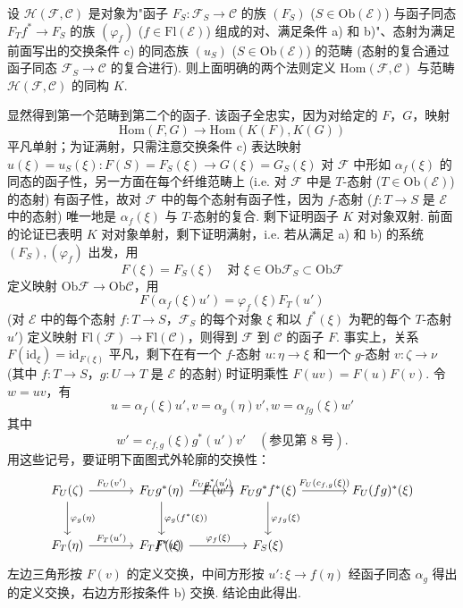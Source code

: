 \begin{proposition}\label{prop:VI.12.1}
设 $\mathcal{H}(\mathcal{F}, \mathcal{C})$ 是对象为"函子 $F_S \colon \mathcal{F}_S \to \mathcal{C}$ 的族 $(F_S)$ ($S \in \mathrm{Ob}(\mathcal{E})$) 与函子同态 $F_T f^{*} \to F_S$ 的族 $(\varphi_f)$ ($f \in \mathrm{Fl}(\mathcal{E})$) 组成的对、满足条件 a) 和 b)"、态射为满足前面写出的交换条件 c) 的同态族 $(u_S)$ ($S \in \mathrm{Ob}(\mathcal{E})$) 的范畴 (态射的复合通过函子同态 $\mathcal{F}_S \to \mathcal{C}$ 的复合进行). 则上面明确的两个法则定义 Hom$(\mathcal{F}, \mathcal{C})$ 与范畴 $\mathcal{H}(\mathcal{F}, \mathcal{C})$ 的同构 $K$.
\end{proposition}

显然得到第一个范畴到第二个的函子. 该函子全忠实，因为对给定的 $F$，$G$，映射
\[
\mathrm{Hom}(F, G) \longrightarrow \mathrm{Hom}(K(F), K(G))
\]
平凡单射；为证满射，只需注意交换条件 c) 表达映射 $u(\xi) = u_S(\xi) \colon F(S) = F_S(\xi) \to G(\xi) = G_S(\xi)$ 对 $\mathcal{F}$ 中形如 $\alpha_f(\xi)$ 的同态的函子性，另一方面在每个纤维范畴上 (i.e. 对 $\mathcal{F}$ 中是 $T$-态射 ($T \in \mathrm{Ob}(\mathcal{E})$) 的态射) 有函子性，故对 $\mathcal{F}$ 中的每个态射有函子性，因为 $f$-态射 ($f \colon T \to S$ 是 $\mathcal{E}$ 中的态射) 唯一地是 $\alpha_f(\xi)$ 与 $T$-态射的复合. 剩下证明函子 $K$ 对对象双射. 前面的论证已表明 $K$ 对对象单射，剩下证明满射，i.e. 若从满足 a) 和 b) 的系统 $(F_S), (\varphi_f)$ 出发，用
\[
F(\xi) = F_S(\xi) \quad \text{对 } \xi \in \mathrm{Ob} \mathcal{F}_S \subset \mathrm{Ob} \mathcal{F}
\]
定义映射 $\mathrm{Ob} \mathcal{F} \to \mathrm{Ob} \mathcal{C}$，用
\[
F(\alpha_f(\xi) u') = \varphi_f(\xi) F_T(u')
\]
(对 $\mathcal{E}$ 中的每个态射 $f \colon T \to S$，$\mathcal{F}_S$ 的每个对象 $\xi$ 和以 $f^{*}(\xi)$ 为靶的每个 $T$-态射 $u'$) 定义映射 $\mathrm{Fl}(\mathcal{F}) \to \mathrm{Fl}(\mathcal{C})$，则得到 $\mathcal{F}$ 到 $\mathcal{C}$ 的函子 $F$. 事实上，关系 $F(\mathrm{id}_{\xi}) = \mathrm{id}_{F(\xi)}$ 平凡，剩下在有一个 $f$-态射 $u \colon \eta \to \xi$ 和一个 $g$-态射 $v \colon \zeta \to \nu$ (其中 $f \colon T \to S$，$g \colon U \to T$ 是 $\mathcal{E}$ 的态射) 时证明乘性 $F(uv) = F(u)F(v)$. 令 $w = uv$，有
\[
u = \alpha_f(\xi) u', v = \alpha_g(\eta) v', w = \alpha_{fg}(\xi) w'
\]
其中
\[
w' = c_{f,g}(\xi) g^{*}(u') v' \quad (\text{参见第 8 号}).
\]
用这些记号，要证明下面图式外轮廓的交换性：
\[
\begin{tikzcd}[row sep=large, column sep=large]
F_U(\zeta) \arrow[rrr, phantom, "F(w')"] \arrow[r,"{F_U(v')}"] \arrow[d,"{\varphi_g(\eta)}"] & F_U g^{*}(\eta) \arrow[r,"{F_U g^{*}(u')}"] \arrow[d,"{\varphi_g(f^{*}(\xi))}"] & F_U g^{*} f^{*}(\xi) \arrow[r,"{F_U(c_{f,g}(\xi))}"] \arrow[d,"{\varphi_{fg}(\xi)}"] & F_U (fg)^{*}(\xi) \\
F_T(\eta) \arrow[rr, phantom, "F(u)"] \arrow[r,"{F_T(u')}"] & F_T f^{*}(\xi) \arrow[r,"{\varphi_f(\xi)}"] & F_S(\xi)
\end{tikzcd}
\]
左边三角形按 $F(v)$ 的定义交换，中间方形按 $u' \colon \xi \to f(\eta)$ 经函子同态 $\alpha_g$ 得出的定义交换，右边方形按条件 b) 交换. 结论由此得出.

